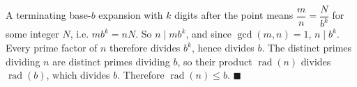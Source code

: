 A terminating base-$b$ expansion with $k$ digits after the point means $\dfrac {m}{n}=\dfrac{N}{b^k}$ for some integer $N$, i.e. $mb^k=nN$. So $n\mid mb^k$, and since $\gcd(m,n)=1$, $n\mid b^k$. Every prime factor of $n$ therefore divides $b^k$, hence divides $b$. The distinct primes dividing $n$ are distinct primes dividing $b$, so their product $\operatorname{rad}(n)$ divides $\operatorname{rad}(b)$, which divides $b$. Therefore $\operatorname{rad}(n)\le b$. $\blacksquare$

